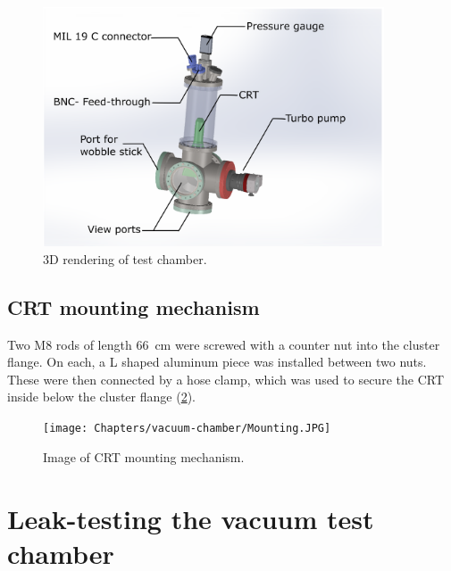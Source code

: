 \begin{figure}[ht]
	\centering
 	
	\includegraphics[width=0.9\textwidth]{./Chapters/vacuum-chamber/vacuum-chamber-annotated} %
	
	\caption{3D rendering of test chamber.}
	\label{fig:3D rendering of test chamber}
\end{figure}
 
\subsection{CRT mounting mechanism}
\label{subsec:CRT mounting mechanism}

Two M8 rods of length \SI{66}{\centi\meter} were screwed with a counter nut into the cluster flange. On each, a L shaped aluminum piece was installed between two nuts. These were then connected by a hose clamp, which was used to secure the CRT inside below the cluster flange (\cref{fig:Image of CRT mounting mechanism}).
 

\begin{figure}[h]
	\centering
	
	\texttt{[image: Chapters/vacuum-chamber/Mounting.JPG]}
	
	\caption{Image of CRT mounting mechanism.}
	\label{fig:Image of CRT mounting mechanism}
\end{figure}


\section{Leak-testing the vacuum test chamber}
\label{sec:Leak-testing the vacuum test chamber}

